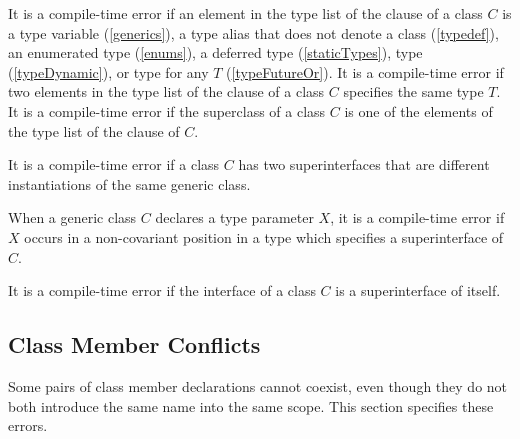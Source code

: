 \documentclass[makeidx]{article}
\begin{document}
\LMHash{}%
It is a compile-time error if an element in the type list of the \IMPLEMENTS{} clause of a class $C$ is
a type variable (\ref{generics}), a type alias that does not denote a class (\ref{typedef}),
an enumerated type (\ref{enums}),
a deferred type (\ref{staticTypes}), type \DYNAMIC{} (\ref{typeDynamic}),
or type  for any $T$ (\ref{typeFutureOr}).
It is a compile-time error if two elements in the type list of
the \IMPLEMENTS{} clause of a class $C$ specifies the same type $T$.
It is a compile-time error if the superclass of a class $C$ is
one of the elements of the type list of the \IMPLEMENTS{} clause of $C$.


\LMHash{}%
It is a compile-time error if a class $C$ has two superinterfaces
that are different instantiations of the same generic class.

\LMHash{}%
When a generic class $C$ declares a type parameter $X$,
it is a compile-time error if $X$ occurs in a non-covariant position
in a type which specifies a superinterface of $C$.

\LMHash{}%
It is a compile-time error if the interface of a class $C$ is a superinterface of itself.



\subsection{Class Member Conflicts}

\LMHash{}%
Some pairs of class member declarations cannot coexist,
even though they do not both introduce the same name into the same scope.
This section specifies these errors.
\end{document}
